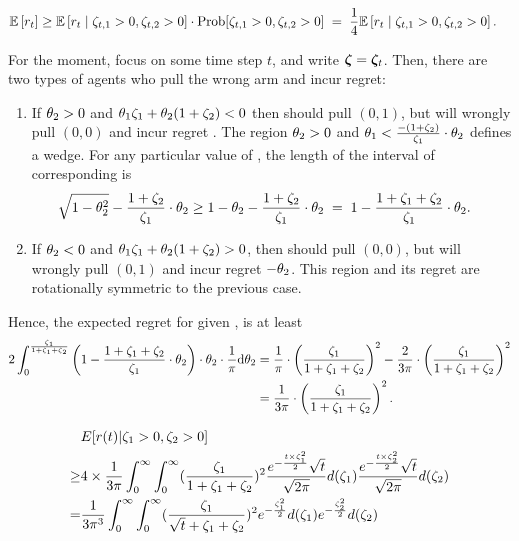 \begin{align*}
\Expect{\Regret{t}} 
  & \geq \ExpectC{\Regret{t}}{\Noise[t]{1} > 0, \Noise[t]{2} > 0}
         \cdot \Prob{\Noise[t]{1} > 0, \Noise[t]{2} > 0}
  \; = \; \quarter \ExpectC{\Regret{t}}{\Noise[t]{1} > 0, \Noise[t]{2} > 0}.
\end{align*}

For the moment, focus on some time step $t$,
and write $\NoiseV = \NoiseV[t]$.
Then, there are two types of agents who pull the wrong arm and incur
regret:
\begin{enumerate}
\item If $\Ag{2} > 0$ and $\Ag{1} \Noise{1} + \Ag{2} (1+\Noise{2}) < 0$
then \AgV should pull $(0,1)$,
but will wrongly pull $(0,0)$ and incur regret .
The region
$\Ag{2} > 0$ and $\Ag{1} < \frac{-(1+\Noise{2})}{\Noise{1}} \cdot \Ag{2}$
defines a wedge.
For any particular value of ,
the length of the interval of corresponding  is
\begin{align*}
  \sqrt{1-\Ag{2}^2} - \frac{1+\Noise{2}}{\Noise{1}} \cdot \Ag{2}
  & \geq 1 - \Ag{2} - \frac{1+\Noise{2}}{\Noise{1}} \cdot \Ag{2}
  \; = \; 1 - \frac{1+\Noise{1}+\Noise{2}}{\Noise{1}} \cdot \Ag{2}.
\end{align*}

\item If $\Ag{2} < 0$ and $\Ag{1} \Noise{1} + \Ag{2} (1+\Noise{2}) > 0$,
then \Ag should pull $(0,0)$,
but will wrongly pull $(0,1)$ and incur regret $-\Ag{2}$.
This region and its regret are rotationally symmetric to the previous
case.
\end{enumerate}

Hence, the expected regret for given ,  is at least
\begin{align*}
  2 \int_0^{\frac{\Noise{1}}{1+\Noise{1}+\Noise{2}}}
  \left( 1 - \frac{1+\Noise{1}+\Noise{2}}{\Noise{1}} \cdot \Ag{2} \right)
  \cdot \Ag{2} \cdot \frac{1}{\pi} \dd \Ag{2}
& =
\frac{1}{\pi} \cdot \left(\frac{\Noise{1}}{1+\Noise{1}+\Noise{2}}\right)^2
- \frac{2}{3 \pi} \cdot \left(\frac{\Noise{1}}{1+\Noise{1}+\Noise{2}}\right)^2
\\ & =
\frac{1}{3 \pi} \cdot \left(\frac{\Noise{1}}{1+\Noise{1}+\Noise{2}}\right)^2.
\end{align*}

\begin{align}
&E[r(t)| \Noise{1}>0, \Noise{2}>0] \nonumber \\
\geq & 4\times \frac{1}{3\pi} \int_{0}^{\infty} \int_{0}^{\infty} (\frac{\Noise{1}}{1+\Noise{1}+\Noise{2}})^2\frac{e^{-\frac{t \times \Noise{1}^2}{2}}\sqrt{t}}{\sqrt{2\pi}}d(\Noise{1})\frac{e^{-\frac{t \times \Noise{2}^2}{2}}\sqrt{t}}{\sqrt{2\pi}}d(\Noise{2}) \nonumber \\
= & \frac{1}{3\pi^3} \int_{0}^{\infty} \int_{0}^{\infty} (\frac{\Noise{1}}{\sqrt{t}+\Noise{1}+\Noise{2}})^2e^{-\frac{\Noise{1}^2}{2}}d(\Noise{1})e^{-\frac{\Noise{2}^2}{2}}d(\Noise{2}) \nonumber 
\end{align}

